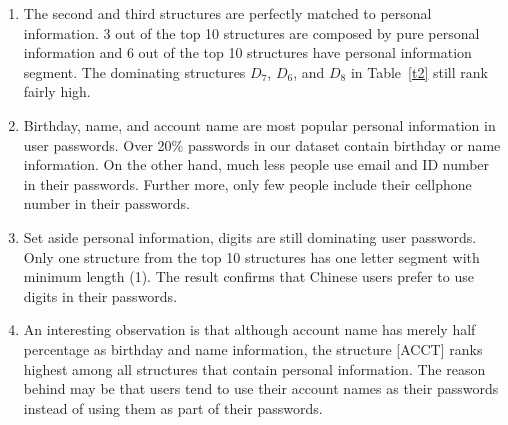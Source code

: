 \documentclass{sig-alternate}
\begin{document}
\begin{enumerate}[leftmargin=*]
\item The second and third structures are perfectly matched to personal information. 3 out of the top 10 structures are composed by pure personal information and 6 out of the top 10 structures have personal information segment. The dominating structures $D_7$, $D_6$, and $D_8$ in Table~\ref{t2} still rank fairly high.
\item Birthday, name, and account name are most popular personal information in user passwords. Over 20\% passwords in our dataset contain birthday or name information. On the other hand, much less people use email and ID number in their passwords. Further more, only few people include their cellphone number in their passwords.  
\item Set aside personal information, digits are still dominating user passwords. Only one structure from the top 10 structures has one letter segment with minimum length (1). The result confirms that Chinese users prefer to use digits in their passwords.
\item An interesting observation is that although account name has merely half percentage as birthday and name information, the structure [ACCT] ranks highest among all structures that contain personal information. The reason behind may be that users tend to use their account names as their passwords instead of using them as part of their passwords. 
\end{enumerate}
\end{document}
